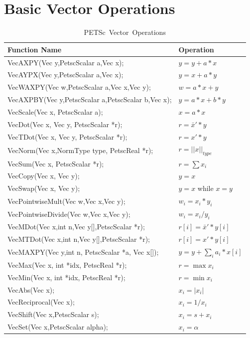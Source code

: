 \section{Basic Vector Operations}
\label{sec_vecbasic}
\begin{table}[tb]
\begin{center}
\begin{tabular}{ll}
{\bf Function Name} & {\bf Operation} \\
\hline
VecAXPY(Vec y,PetscScalar a,Vec x); & $ y = y + a*x$ \\
VecAYPX(Vec y,PetscScalar a,Vec x); & $ y = x + a*y$ \\
VecWAXPY(Vec w,PetscScalar a,Vec x,Vec y); & $ w = a*x + y$ \\
VecAXPBY(Vec y,PetscScalar a,PetscScalar b,Vec x); & $ y = a*x + b*y$ \\
VecScale(Vec x, PetscScalar a); & $ x = a*x $ \\
VecDot(Vec x, Vec y, PetscScalar *r); & $ r = \bar{x}'*y$ \\
VecTDot(Vec x, Vec y, PetscScalar *r); & $ r = x'*y$ \\
VecNorm(Vec x,NormType type,  PetscReal *r); & $ r = ||x||_{type}$ \\
VecSum(Vec x,   PetscScalar *r); & $ r = \sum x_{i}$ \\
VecCopy(Vec x, Vec y); & $ y = x $ \\
VecSwap(Vec x, Vec y); & $ y = x $ while $ x = y$ \\
VecPointwiseMult(Vec w,Vec x,Vec y); & $ w_{i} = x_{i}*y_{i} $ \\
VecPointwiseDivide(Vec w,Vec x,Vec y); & $ w_{i} = x_{i}/y_{i} $ \\
VecMDot(Vec x,int n,Vec y[],PetscScalar *r); & $ r[i] = \bar{x}'*y[i]$ \\
VecMTDot(Vec x,int n,Vec y[],PetscScalar *r); & $ r[i] = x'*y[i]$ \\
VecMAXPY(Vec y,int n, PetscScalar *a, Vec x[]); \hspace{1cm} & $ y = y + \sum_i a_{i}*x[i] $ \\
VecMax(Vec x,  int *idx, PetscReal *r); & $ r = \max x_{i}$ \\
VecMin(Vec x,  int *idx, PetscReal *r); & $ r = \min x_{i}$ \\
VecAbs(Vec x); & $ x_i = |x_{i}|$ \\
VecReciprocal(Vec x); & $ x_i = 1/x_{i}$ \\
VecShift(Vec x,PetscScalar s); & $ x_i = s + x_{i}$ \\
VecSet(Vec x,PetscScalar alpha); & $ x_i = \alpha$ \\
\hline
\end{tabular}
\end{center}
\caption{\hbox{PETSc Vector Operations}}
\label{fig_vectorops}
\end{table}


